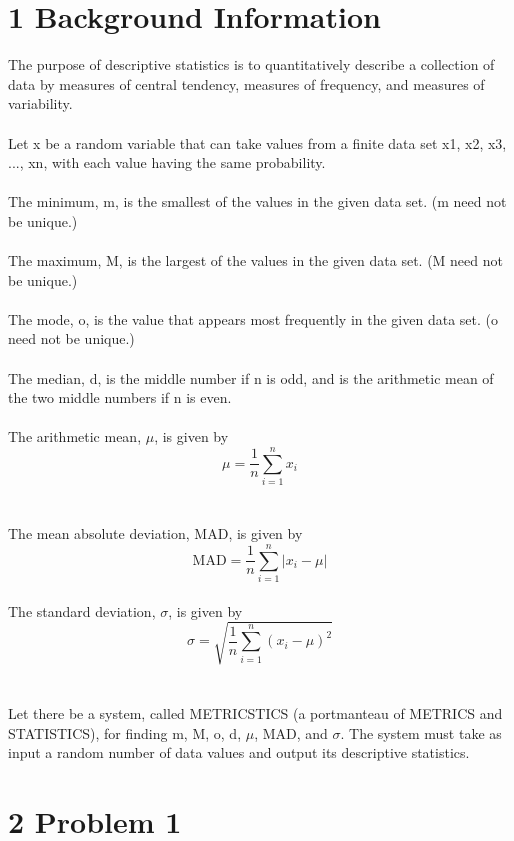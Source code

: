 \section{1 Background Information}

The purpose of descriptive statistics is to quantitatively describe a collection of data by measures of central tendency, measures of frequency, and measures of variability. \\
\\Let x be a random variable that can take values from a finite data set x1, x2, x3, ..., xn, with each value having the same probability. \\
\\The minimum, m, is the smallest of the values in the given data set. (m need not be unique.)\\
\\The maximum, M, is the largest of the values in the given data set. (M need not be unique.)\\
\\The mode, o, is the value that appears most frequently in the given data set. (o need not be unique.)\\
\\The median, d, is the middle number if n is odd, and is the arithmetic mean of the two middle numbers if n is even.\\
%
%
\\The arithmetic mean, $\mu$, is given by
\[ \mu = \frac{1}{n} \sum_{i=1}^{n} x_i \]\\
%
%
\\The mean absolute deviation, MAD, is given by
\[ \text{MAD} = \frac{1}{n} \sum_{i=1}^{n} |x_i - \mu| \]\\
%
%
The standard deviation, $\sigma$, is given by
\[ \sigma = \sqrt{\frac{1}{n}\sum_{i=1}^{n}(x_i - \mu)^2} \]\\
\\Let there be a system, called METRICSTICS (a portmanteau of METRICS and
STATISTICS), for finding m, M, o, d, $\mu$, MAD, and $\sigma$. The system must take as input a random number of data values and output its descriptive statistics. 


\vspace{100pt}
\section{2 Problem 1}
\vspace{10pt}
